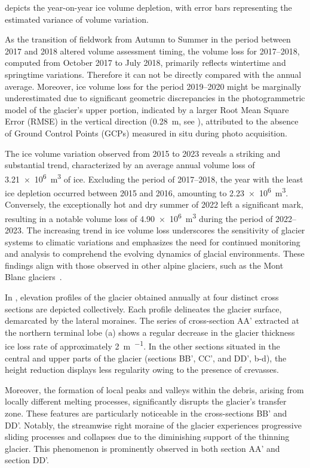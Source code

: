  depicts the year-on-year ice volume depletion, with error bars 
representing the estimated variance of volume variation. 

As the transition of fieldwork from Autumn to Summer in the period between 2017 and 2018 altered 
volume assessment timing, the volume loss for 2017--2018, computed from October 2017 to July 2018, 
primarily reflects wintertime and springtime variations.
Therefore it can not be directly compared with the annual average.
Moreover, ice volume loss for the period 2019--2020 might be marginally underestimated due to
significant geometric discrepancies in the photogrammetric model of the glacier's upper portion,
indicated by a larger Root Mean Square Error (RMSE) in the vertical direction (\SI{0.28}{\meter}, 
see ), attributed to the absence of Ground Control Points (GCPs) measured 
in situ during photo acquisition. 

The ice volume variation observed from 2015 to 2023 reveals a striking and substantial trend, 
characterized by an average annual volume loss of \SI{3.21e6}{\cubic\meter} of ice. 
Excluding the period of 2017--2018, the year with the least ice depletion occurred between 2015 and 2016,
amounting to \SI{2.23e6}{\cubic\meter}. 
Conversely, the exceptionally hot and dry summer of 2022 left a significant mark, resulting in a notable volume 
loss of \SI{4.90e6}{\cubic\meter} during the period of 2022--2023.
The increasing trend in ice volume loss underscores the sensitivity of glacier systems to climatic variations and 
emphasizes the need for continued monitoring and analysis to comprehend the evolving dynamics of glacial environments.
These findings align with those observed in other alpine glaciers, such as the Mont Blanc glaciers~\citep{Berthier2023b_exceptional_thinning}.

In , elevation profiles of the glacier obtained annually at four distinct cross sections are depicted collectively. 
Each profile delineates the glacier surface, demarcated by the lateral moraines. 
The series of cross-section AA' extracted at the northern terminal lobe (a) shows a regular decrease in the glacier thickness
ice loss rate of approximately \qty{2}{\meter\per\year}.
In the other sections situated in the central and upper parts of the glacier (sections BB', CC', and DD', b-d), 
the height reduction displays less regularity owing to the presence of crevasses.

Moreover, the formation of local peaks and valleys within the debris, arising from locally different melting processes, significantly disrupts the glacier's transfer zone. 
These features are particularly noticeable in the cross-sections BB' and DD'.
Notably, the streamwise right moraine of the glacier experiences progressive sliding processes and collapses due to the diminishing support of the thinning glacier. 
This phenomenon is prominently observed in both section AA' and section DD'.

